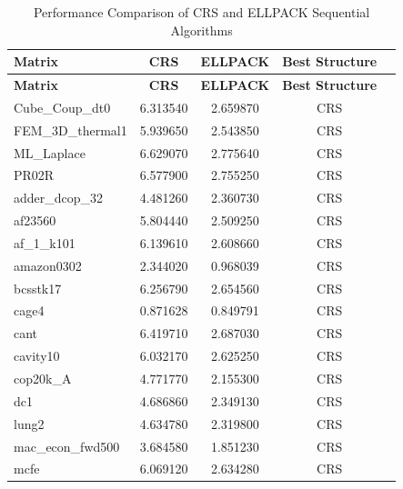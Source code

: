 \documentclass[12pt,oneside]{book} %
\begin{document}
\newpage
\begin{longtable}{lcccr}
    \caption{Performance Comparison of CRS and ELLPACK Sequential Algorithms}     \\
    \toprule
    \textbf{Matrix}   & \textbf{CRS} & \textbf{ELLPACK} & \textbf{Best Structure} \\
    \midrule
    \endfirsthead
    \toprule
    \textbf{Matrix}   & \textbf{CRS} & \textbf{ELLPACK} & \textbf{Best Structure} \\
    \midrule
    \endhead
    \bottomrule
    \endfoot
    Cube\_Coup\_dt0   & 6.313540     & 2.659870         & CRS                     \\
    FEM\_3D\_thermal1 & 5.939650     & 2.543850         & CRS                     \\
    ML\_Laplace       & 6.629070     & 2.775640         & CRS                     \\
    PR02R             & 6.577900     & 2.755250         & CRS                     \\
    adder\_dcop\_32   & 4.481260     & 2.360730         & CRS                     \\
    af23560           & 5.804440     & 2.509250         & CRS                     \\
    af\_1\_k101       & 6.139610     & 2.608660         & CRS                     \\
    amazon0302        & 2.344020     & 0.968039         & CRS                     \\
    bcsstk17          & 6.256790     & 2.654560         & CRS                     \\
    cage4             & 0.871628     & 0.849791         & CRS                     \\
    cant              & 6.419710     & 2.687030         & CRS                     \\
    cavity10          & 6.032170     & 2.625250         & CRS                     \\
    cop20k\_A         & 4.771770     & 2.155300         & CRS                     \\
    dc1               & 4.686860     & 2.349130         & CRS                     \\
    lung2             & 4.634780     & 2.319800         & CRS                     \\
    mac\_econ\_fwd500 & 3.684580     & 1.851230         & CRS                     \\
    mcfe              & 6.069120     & 2.634280         & CRS                     \\

\end{longtable}
\end{document}
